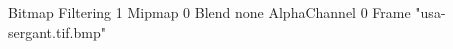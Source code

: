 {Bitmap
	{Filtering 1}
	{Mipmap 0}
	{Blend none}
	{AlphaChannel 0}
	{Frame "usa-sergant.tif.bmp"}
}

